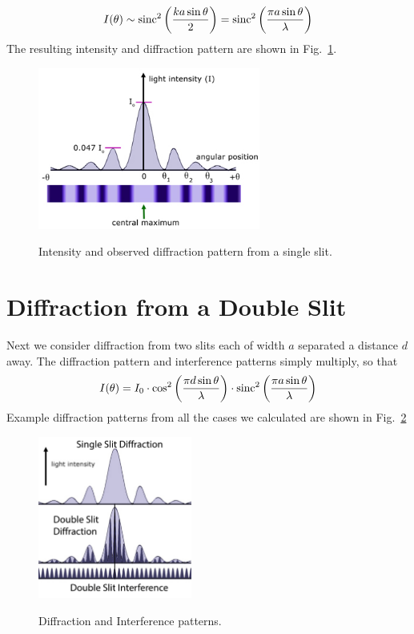 \documentclass[12pt]{article}
\begin{document}
\begin{equation}
I(\theta) \sim {\rm sinc}^2\left( \frac{k a \sin \theta}{2} \right) = {\rm sinc}^2\left( \frac{\pi a \sin \theta}{\lambda} \right)
\end{equation}
The resulting intensity and diffraction pattern are shown in Fig.~\ref{fig:diff-single}.
\begin{figure}[thb]
\begin{center}
{\includegraphics[width=0.65\textwidth]{figs/diff-single.jpg}}
\end{center}
\caption{\label{fig:diff-single} Intensity and observed diffraction pattern from a single slit.}
\end{figure}

\section{Diffraction from a Double Slit}

Next we consider diffraction from two slits each of width $a$ separated a distance $d$ away.  The diffraction pattern and interference patterns simply multiply, so that 
\begin{equation}
I(\theta) = I_0 \cdot \cos^2\left( \frac{\pi d \sin \theta}{\lambda}\right) 
\cdot {\rm sinc}^2\left( \frac{\pi a \sin \theta}{\lambda} \right)
\end{equation}
Example diffraction patterns from all the cases we calculated are shown in Fig.~\ref{fig:combined}

\begin{figure}[thb]
\begin{center}
{\includegraphics[width=0.45\textwidth]{figs/combined.pdf}}
\end{center}
\caption{\label{fig:combined} Diffraction and Interference patterns.}
\end{figure}
\end{document}
